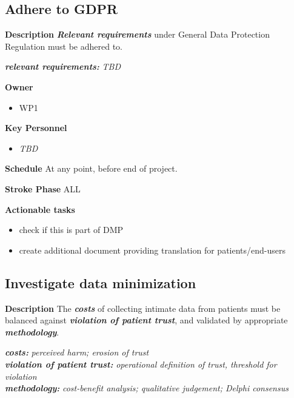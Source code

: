 \documentclass[
  letterpaper,
  DIV=11,
  numbers=noendperiod]{scrreport}
\providecommand{\tightlist}{%
  \setlength{\itemsep}{0pt}\setlength{\parskip}{0pt}}\usepackage{longtable,booktabs,array}
\begin{document}
\hypertarget{adhere-to-gdpr}{%
\subsection{Adhere to GDPR}\label{adhere-to-gdpr}}

\textbf{Description} \textbf{\emph{Relevant requirements}} under General
Data Protection Regulation must be adhered to.

\textbf{\emph{relevant requirements:}} \emph{TBD}

\textbf{Owner}

\begin{itemize}
\tightlist
\item
  WP1
\end{itemize}

\textbf{Key Personnel}

\begin{itemize}
\tightlist
\item
  \emph{TBD}
\end{itemize}

\textbf{Schedule} At any point, before end of project.

\textbf{Stroke Phase} ALL

\textbf{Actionable tasks}

\begin{itemize}
\tightlist
\item
  check if this is part of DMP
\item
  create additional document providing translation for
  patients/end-users
\end{itemize}

\hypertarget{investigate-data-minimization}{%
\subsection{Investigate data
minimization}\label{investigate-data-minimization}}

\textbf{Description} The \textbf{\emph{costs}} of collecting intimate
data from patients must be balanced against \textbf{\emph{violation of
patient trust}}, and validated by appropriate
\textbf{\emph{methodology}}.

\textbf{\emph{costs:}} \emph{perceived harm; erosion of trust}\\
\textbf{\emph{violation of patient trust:}} \emph{operational definition
of trust, threshold for violation}\\
\textbf{\emph{methodology:}} \emph{cost-benefit analysis; qualitative
judgement; Delphi consensus}
\end{document}
